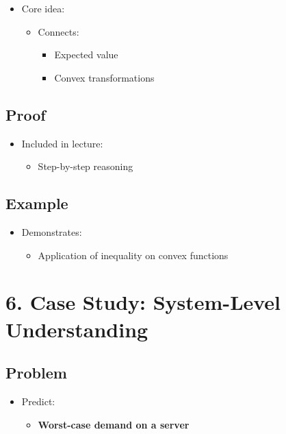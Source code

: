 \documentclass[12pt]{article}
\begin{document}
\begin{itemize}
    \item Core idea:
    \begin{itemize}
        \item Connects:
        \begin{itemize}
            \item Expected value
            \item Convex transformations
        \end{itemize}
    \end{itemize}
\end{itemize}

\subsection*{Proof}

\begin{itemize}
    \item Included in lecture:
    \begin{itemize}
        \item Step-by-step reasoning
    \end{itemize}
\end{itemize}

\subsection*{Example}

\begin{itemize}
    \item Demonstrates:
    \begin{itemize}
        \item Application of inequality on convex functions
    \end{itemize}
\end{itemize}

\section*{6. Case Study: System-Level Understanding}

\subsection*{Problem}

\begin{itemize}
    \item Predict:
    \begin{itemize}
        \item \textbf{Worst-case demand on a server}
    \end{itemize}
\end{itemize}
\end{document}
